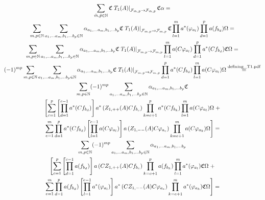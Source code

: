 \documentclass[a4paper,12pt]{article}
\newcommand{\equaltext}[1]{\ensuremath{\stackrel{\text{#1}}{=}}}
\begin{document}
\begin{multline}
\sum_{\tilde{m},\tilde{p}\in \mathbb{N}}\mathfrak{C} \left. T_1(A)\right|_{\mathcal{F}_{\tilde{m},\tilde{p}}\rightarrow\mathcal{F}_{\tilde{m},\tilde{p}}} \mathfrak{C} \alpha= \\
\sum_{m,p \in \mathbb{N}} \sum_{a_1, \dots a_m, b_1, \dots b_p \in \mathbb{N}} \alpha_{a_1, \dots a_m, b_1, \dots b_p} \mathfrak{C} \left. T_1(A)\right|_{\mathcal{F}_{m,p}\rightarrow\mathcal{F}_{m,p}} \mathfrak{C} \prod_{l=1}^m a^*(\varphi_{a_l})\prod_{d=1}^p a(f_{b_d})\Omega=\\
\sum_{m,p \in \mathbb{N}} \sum_{a_1, \dots a_m, b_1, \dots b_p \in \mathbb{N}} \alpha_{a_1, \dots a_m, b_1, \dots b_p} \mathfrak{C} \left. T_1(A)\right|_{\mathcal{F}_{m,p}\rightarrow\mathcal{F}_{m,p}}  \prod_{l=1}^m a(C \varphi_{a_l})\prod_{d=1}^p a^*(C f_{b_d})\mathfrak{C}\Omega=\\
(-1)^{m p}\sum_{m,p \in \mathbb{N}} \sum_{a_1, \dots a_m, b_1, \dots b_p \in \mathbb{N}} \alpha_{a_1, \dots a_m, b_1, \dots b_p} \mathfrak{C} \left. T_1(A)\right|_{\mathcal{F}_{m,p}\rightarrow\mathcal{F}_{m,p}}  \prod_{d=1}^p a^*(C f_{b_d}) \prod_{l=1}^m a(C \varphi_{a_l})\Omega\equaltext{defining\textunderscore T1.pdf}\\
\sum_{m,p \in \mathbb{N}} (-1)^{m p} \sum_{a_1, \dots a_m, b_1, \dots b_p \in \mathbb{N}} \alpha_{a_1, \dots a_m, b_1, \dots b_p} \mathfrak{C}\\
\left[ \sum_{c=1}^p  \left[\prod_{d=1}^{c-1} a^*(C f_{b_d})\right]  a^*\left(Z_{1,++}(A)C f_{b_c}\right) \prod_{k=c+1}^{p} a^*(C f_{b_k})  \prod_{l=1}^m a(C \varphi_{a_l}) \Omega \right.
+\\
\left. \sum_{e=1}^m  \prod_{d=1}^{p} a^*(C f_{b_d})  \left[ \prod_{l=1}^{e-1} a(C \varphi_{a_l}) \right]  a\left(Z_{1,--}(A) C \varphi_{a_e}\right)  \prod_{k=e+1}^{m} a(C \varphi_{a_k}) \Omega \right] =\\
\sum_{m,p \in \mathbb{N}} (-1)^{m p} \sum_{a_1, \dots a_m, b_1, \dots b_p \in \mathbb{N}} \alpha_{a_1, \dots a_m, b_1, \dots b_p} \\
\left[ \sum_{c=1}^p  \left[\prod_{d=1}^{c-1} a( f_{b_d})\right]  a\left(C Z_{1,++}(A)C f_{b_c}\right) \prod_{k=c+1}^{p} a( f_{b_k})  \prod_{l=1}^m a^*( \varphi_{a_l}) \mathfrak{C} \Omega \right.
+\\
\left. \sum_{e=1}^m  \prod_{d=1}^{p} a( f_{b_d})  \left[ \prod_{l=1}^{e-1} a^*( \varphi_{a_l}) \right]  a^*\left(C Z_{1,--}(A) C \varphi_{a_e}\right)  \prod_{k=e+1}^{m} a^*( \varphi_{a_k})\mathfrak{C} \Omega \right] =\\

\end{multline}
\end{document}
